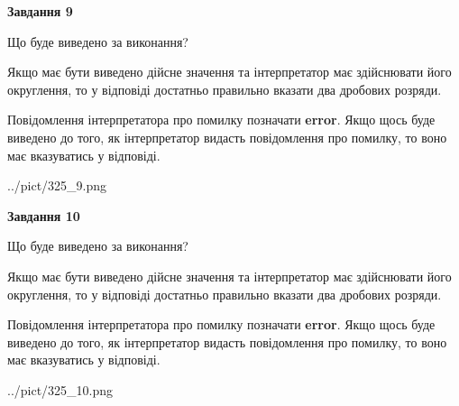 \documentclass[12pt, ukrainian]{article}
\begin{document}
{\begin {Large}
{\begin {center}\textbf{Завдання 9}\end {center}}\par
Що буде виведено за виконання? \par

Якщо має бути виведено дійсне значення та інтерпретатор має здійснювати його округлення, 
то у відповіді достатньо правильно вказати два дробових розряди.

Повідомлення інтерпретатора про помилку позначати \textbf{error}.
Якщо щось буде виведено до того, як інтерпретатор видасть повідомлення про помилку, 
то воно має вказуватись у відповіді. \par

\begin{center}
	{../pict/325_9.png}
\end{center}
\newpage

{\begin {center}\textbf{Завдання 10}\end {center}}\par
Що буде виведено за виконання? \par

Якщо має бути виведено дійсне значення та інтерпретатор має здійснювати його округлення, 
то у відповіді достатньо правильно вказати два дробових розряди.

Повідомлення інтерпретатора про помилку позначати \textbf{error}.
Якщо щось буде виведено до того, як інтерпретатор видасть повідомлення про помилку, 
то воно має вказуватись у відповіді. \par

\begin{center}
	{../pict/325_10.png}
\end{center}
\newpage

\end {Large}}
\end{document}
